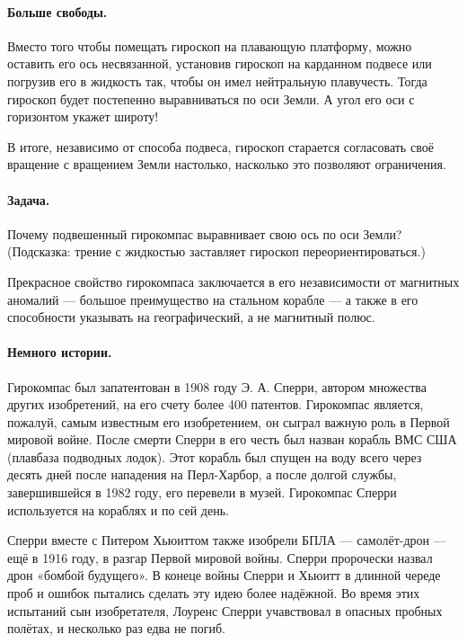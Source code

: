 \paragraph{Больше свободы.}
Вместо того чтобы помещать гироскоп на плавающую платформу, можно оставить его ось несвязанной, установив гироскоп на карданном подвесе или погрузив его в жидкость так, чтобы он имел нейтральную плавучесть.
Тогда гироскоп будет постепенно выравниваться по оси Земли. А угол его оси с горизонтом укажет широту!

В итоге, независимо от способа подвеса, гироскоп старается согласовать своё вращение с вращением Земли настолько, насколько это позволяют ограничения.

\paragraph{Задача.} Почему подвешенный гирокомпас выравнивает свою ось по оси Земли?
(Подсказка: трение с жидкостью заставляет гироскоп переориентироваться.)

Прекрасное свойство гирокомпаса заключается в его независимости от магнитных аномалий --- большое преимущество на стальном корабле --- а также в его способности указывать на географический, а не магнитный полюс.

\paragraph{Немного истории.}
Гирокомпас был запатентован в 1908 году Э. А. Сперри, автором множества других изобретений, на его счету более 400 патентов.
Гирокомпас является, пожалуй, самым известным его изобретением, он сыграл важную роль в Первой мировой войне.
После смерти Сперри в его честь был назван корабль ВМС США (плавбаза подводных лодок).
Этот корабль был спущен на воду всего через десять дней после нападения на Перл-Харбор, а после долгой службы, завершившейся в 1982 году, его перевели в музей.
Гирокомпас Сперри используется на кораблях и по сей день.

Сперри вместе с Питером Хьюиттом также изобрели БПЛА --- самолёт-дрон --- ещё в 1916 году, в разгар Первой мировой войны.
Сперри пророчески назвал дрон «бомбой будущего».
В конеце войны Сперри и Хьюитт в длинной череде проб и ошибок пытались сделать эту идею более надёжной.
Во время этих испытаний сын изобретателя, Лоуренс Сперри учавствовал в опасных пробных полётах, и  несколько раз едва не погиб.
